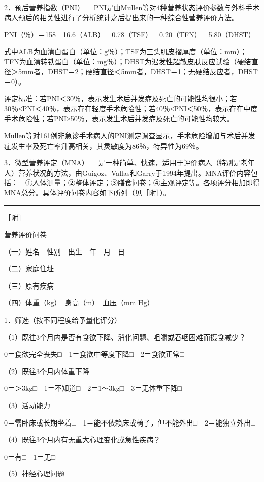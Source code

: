 {2．预后营养指数（PNI）}
　PNI是由Mullen等对4种营养状态评价参数与外科手术病人预后的相关性进行了分析统计之后提出来的一种综合性营养评价方法。

PNI（％）＝158－16.6（ALB）－0.78（TSF）－0.20（TFN）－5.80（DHST）

式中ALB为血清白蛋白（单位：g％）；TSF为三头肌皮褶厚度（单位：mm）；TFN为血清转铁蛋白（单位：mg％）；DHST为迟发性超敏皮肤反应试验（硬结直径＞5mm者，DHST＝2；硬结直径＜5mm者，DHST＝1；无硬结反应者，DHST＝0）。

评定标准：若PNI＜30％，表示发生术后并发症及死亡的可能性均很小；若30％≤PNI＜40％，表示存在轻度手术危险性；若40％≤PNI＜50％，表示存在中度手术危险性；若PNI≥50％，表示发生术后并发症及死亡的可能性均较大。

Mullen等对161例非急诊手术病人的PNI测定调查显示，手术危险增加与术后并发症发生率及死亡率升高相关，其灵敏度为86％，特异性为69％。

{3．微型营养评定（MNA）}
　是一种简单、快速，适用于评价病人（特别是老年人）营养状况的方法，由Guigoz、Vallas和Garry于1994年提出。MNA评价内容包括：　①人体测量；②整体评定；③膳食问卷；④主观评定等。各项评分相加即得MNA总分。具体评价问卷内容如下所列（见［附］）。

\begin{center}\rule{0.5\linewidth}{\linethickness}\end{center}

［附］

营养评价问卷

（一）姓名　性别　出生　年　月　日

（二）家庭住址

（三）原有疾病

（四）体重（kg）　身高（m）　血压（mm Hg）

1．筛选（按不同程度给予量化评分）

（1）既往3个月内是否有食欲下降、消化问题、咀嚼或吞咽困难而摄食减少？

0＝食欲完全丧失□　1＝食欲中等度下降□　2＝食欲正常□

（2）既往3个月内体重下降

0＝＞3kg□　1＝不知道□　2＝1～3kg□　3＝无体重下降□

（3）活动能力

0＝需卧床或长期坐着□　1＝能不依赖床或椅子，但不能外出□　2＝能独立外出□

（4）既往3个月内有无重大心理变化或急性疾病？

0＝有□　1＝无□

（5）神经心理问题

